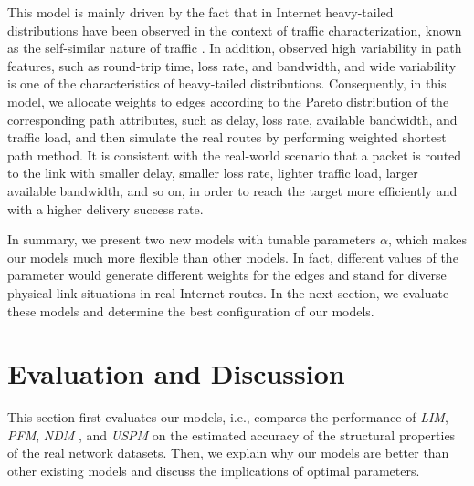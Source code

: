 \documentclass[a4paper]{llncs}
\begin{document}
This model is mainly driven by the fact that
in Internet heavy-tailed distributions have been observed in the context of traffic characterization, known as the self-similar nature of traffic \cite{WideAreaTraffic,WWWTraffic,ParetoModulatedModel}.
In addition, \cite{EndToEndRouting} observed high variability in path features, such as round-trip time, loss rate, and bandwidth, and wide variability is one of the characteristics of heavy-tailed distributions. Consequently, in this model, we allocate weights to edges according to the Pareto distribution of the corresponding path attributes, such as delay, loss rate, available bandwidth, and traffic load, and then simulate the real routes by performing weighted shortest path method. It is consistent with the real-world scenario that a packet is routed to the link with smaller delay, smaller loss rate, lighter traffic load, larger available bandwidth, and so on, in order to reach the target more efficiently and with a higher delivery success rate.

In summary, we present two new models with tunable parameters $\alpha$, which makes our models much more flexible than other models. In fact, different values of the parameter would generate different weights for the edges and stand for diverse physical link situations in real Internet routes. In the next section, we evaluate these models and determine the best configuration of our models.

\section{Evaluation and Discussion}
\label{sec:evaluation}
This section first evaluates our models, i.e., compares
the performance of \textit{LIM}, \textit{PFM}, \textit{NDM}
\cite{SimulatingInternetRoute}, and \textit{USPM} on the estimated accuracy of the structural properties of the real
network datasets. Then, we explain why our models are better than other existing models and discuss the implications of optimal parameters.
\end{document}
